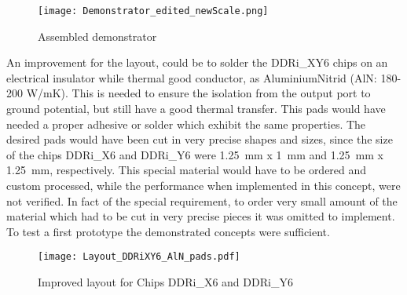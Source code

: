 \begin{figure}[htb!] %
	\centering
  \texttt{[image: Demonstrator\_edited\_newScale.png]}
	\caption{Assembled demonstrator}
	\label{fig:assembledDemonstrator}
\end{figure}

\newpage
An improvement for the layout, could be to solder the DDRi\_XY6 chips on an electrical insulator while thermal good conductor, as AluminiumNitrid (AlN: 180-200 W/mK). 
This is needed to ensure the isolation from the output port to ground potential, but still have a good thermal transfer.
This pads would have needed a proper adhesive or solder which exhibit the same properties.
The desired pads would have been cut in very precise shapes and sizes, since the size of the chips DDRi\_X6 and DDRi\_Y6 were \SI{1.25}{\milli \meter} x \SI{1}{\milli \meter} and \SI{1.25}{\milli \meter} x \SI{1.25}{\milli \meter}, respectively.
This special material would have to be ordered and custom processed, while the performance when implemented in this concept, were not verified.
In fact of the special requirement, to order very small amount of the material which had to be cut in very precise pieces it was omitted to implement.
To test a first prototype the demonstrated concepts were sufficient.


\begin{figure}[htb!]
	\centering
  \texttt{[image: Layout\_DDRiXY6\_AlN\_pads.pdf]}
	\caption{Improved layout for Chips DDRi\_X6 and DDRi\_Y6}
	\label{fig:DDRiXY6AlNpads}
\end{figure}